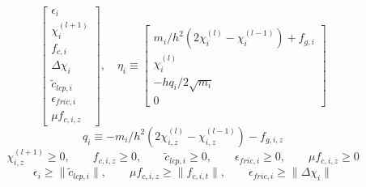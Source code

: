 \documentclass[a4paper,10pt]{article}
\begin{document}
\begin{landscape}
\begin{equation}
\left[\begin{array}{c}
\epsilon_i \\ \chi^{(l+1)}_i \\ f_{c,i} \\ \Delta\chi_i \\ \tilde{c}_{lcp,i} \\ \epsilon_{fric,i} \\ \mu f_{c,i,z}
\end{array}\right], \quad
\eta_i \equiv
\left[\begin{array}{c}
m_i/h^2(2\chi^{(l)}_i-\chi^{(l-1)}_i) + f_{g,i} \\
\chi^{(l)}_i \\
-hq_i/2\sqrt{m_i} \\
0
\end{array}\right]
\end{equation}
\begin{equation}
q_i \equiv -m_i/h^2(2\chi^{(l)}_{i,z}-\chi^{(l-1)}_{i,z})-f_{g,i,z}
\end{equation}
\begin{equation}
\chi^{(l+1)}_{i,z} \geq 0       , \quad\quad
f_{c,i,z} \geq 0              , \quad\quad
\tilde{c}_{lcp,i} \geq 0          , \quad\quad
\epsilon_{fric,i} \geq 0          , \quad\quad
\mu f_{c,i,z} \geq 0
\end{equation}
\begin{equation}
\epsilon_i            \geq \| \tilde{c}_{lcp,i} \| , \quad\quad
\mu f_{c,i,z}  \geq \| f_{c,i,t}         \| , \quad\quad
\epsilon_{fric,i}    \geq \| \Delta\chi_i      \|
\end{equation}
\end{landscape}
\end{document}
